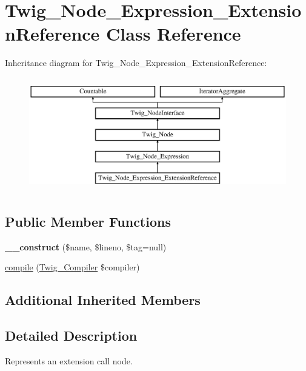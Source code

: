 \hypertarget{classTwig__Node__Expression__ExtensionReference}{}\section{Twig\+\_\+\+Node\+\_\+\+Expression\+\_\+\+Extension\+Reference Class Reference}
\label{classTwig__Node__Expression__ExtensionReference}
Inheritance diagram for Twig\+\_\+\+Node\+\_\+\+Expression\+\_\+\+Extension\+Reference\+:\begin{figure}[H]
\begin{center}
\leavevmode
\includegraphics[height=5.000000cm]{classTwig__Node__Expression__ExtensionReference}
\end{center}
\end{figure}
\subsection*{Public Member Functions}
\begin{DoxyCompactItemize}
\item 
{\bfseries \+\_\+\+\_\+construct} (\$name, \$lineno, \$tag=null)\hypertarget{classTwig__Node__Expression__ExtensionReference_a6946d7b9eefa869d8f81f8805ffa7439}{}\label{classTwig__Node__Expression__ExtensionReference_a6946d7b9eefa869d8f81f8805ffa7439}

\item 
\hyperlink{classTwig__Node__Expression__ExtensionReference_a6907d184d47cf5deee5d80fd20373e85}{compile} (\hyperlink{classTwig__Compiler}{Twig\+\_\+\+Compiler} \$compiler)
\end{DoxyCompactItemize}
\subsection*{Additional Inherited Members}


\subsection{Detailed Description}
Represents an extension call node.


